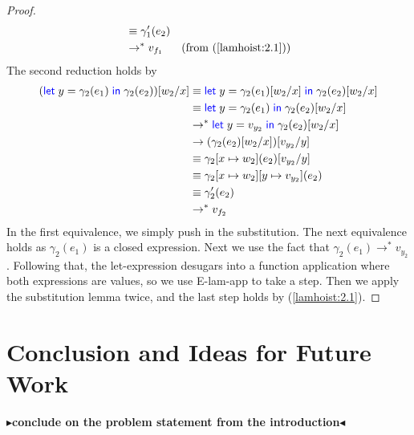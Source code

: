 \documentclass[twoside,11pt,openright]{report}
\theoremstyle{definition}
\newcommand{\var}{x}
\newcommand{\varB}{y}
\newcommand{\expr}{e}
\newcommand{\val}{v}
\newcommand{\valB}{w}
\newcommand{\subst}[3]{#1{\left[#3 \middle/ #2 \right]}}
\newcommand{\step}{\rightarrow}
\newcommand{\stepS}{\rightarrow^*}
\newcommand{\map}[2]{#1 \mapsto #2}
\newcommand{\todo}[1]{{\color[rgb]{.5,0,0}\textbf{$\blacktriangleright$#1$\blacktriangleleft$}}}
\begin{document}
\begin{proof}
\begin{align*}
    &\equiv \gamma'_1(\expr_2)\\
    &\stepS \val_{f_1} &\text{(from (\ref{lamhoist:2.1}))}
  \end{align*}
  The second reduction holds by
  \begin{align*}
    \subst{(\Let \varB = \gamma_2(\expr_1) in \gamma_2(\expr_2))}{\var}{\valB_2}
    &\equiv
    \Let \varB = \subst{\gamma_2(\expr_1)}{\var}{\valB_2} in \subst{\gamma_2(\expr_2)}{\var}{\valB_2}\\
    &\equiv
    \Let \varB = \gamma_2(\expr_1) in \subst{\gamma_2(\expr_2)}{\var}{\valB_2}\\
    &\stepS
    \Let \varB = \val_{y_2} in \subst{\gamma_2(\expr_2)}{\var}{\valB_2}\\
    &\step
    \subst{(\subst{\gamma_2(\expr_2)}{\var}{\valB_2})}{\varB}{\val_{y_2}}\\
    &\equiv
    \subst{\gamma_2[\map{\var}{\valB_2}](\expr_2)}{\varB}{\val_{y_2}}\\
    &\equiv
    \gamma_2[\map{\var}{\valB_2}][\map{\varB}{\val_{y_2}}](\expr_2)\\
    &\equiv
    \gamma'_2(\expr_2)\\
    &\stepS \val_{f_2}
  \end{align*}
  In the first equivalence, we simply push in the substitution. The next equivalence holds as $\gamma_2(\expr_1)$ is a closed expression. Next we use the fact that $\gamma_2(\expr_1) \stepS \val_{y_2}$. Following that, the let-expression desugars into a function application where both expressions are values, so we use E-lam-app to take a step. Then we apply the substitution lemma twice, and the last step holds by (\ref{lamhoist:2.1}).
\end{proof}



\chapter{Conclusion and Ideas for Future Work}
\label{ch:conclusion}

\todo{conclude on the problem statement from the introduction}

\end{document}
